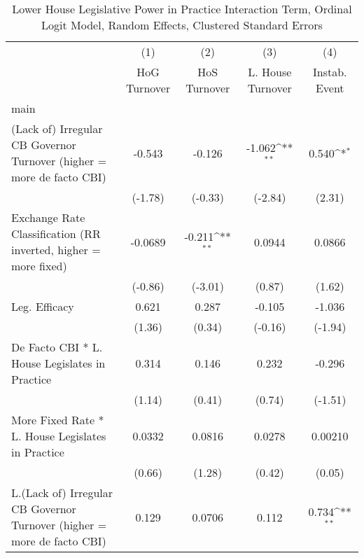 {
\def\sym#1{\ifmmode^{#1}\else\(^{#1}\)\fi}
\begin{longtable}{l*{4}{c}}
\caption{Lower House Legislative Power in Practice Interaction Term, Ordinal Logit Model, Random Effects, Clustered Standard Errors \label{llpintlagordLogDF}}\\
\hline\hline\endfirsthead\hline\endhead\hline\endfoot\endlastfoot
                &\multicolumn{1}{c}{(1)}&\multicolumn{1}{c}{(2)}&\multicolumn{1}{c}{(3)}&\multicolumn{1}{c}{(4)}\\
                &\multicolumn{1}{c}{HoG Turnover}&\multicolumn{1}{c}{HoS Turnover}&\multicolumn{1}{c}{L. House Turnover}&\multicolumn{1}{c}{Instab. Event}\\
\hline
main            &                  &                  &                  &                  \\
(Lack of) Irregular CB Governor Turnover (higher = more de facto CBI)&   -0.543         &   -0.126         &   -1.062\sym{**} &    0.540\sym{*}  \\
                &  (-1.78)         &  (-0.33)         &  (-2.84)         &   (2.31)         \\
[1em]
Exchange Rate Classification (RR inverted, higher = more fixed)&  -0.0689         &   -0.211\sym{**} &   0.0944         &   0.0866         \\
                &  (-0.86)         &  (-3.01)         &   (0.87)         &   (1.62)         \\
[1em]
Leg. Efficacy   &    0.621         &    0.287         &   -0.105         &   -1.036         \\
                &   (1.36)         &   (0.34)         &  (-0.16)         &  (-1.94)         \\
[1em]
De Facto CBI * L. House Legislates in Practice&    0.314         &    0.146         &    0.232         &   -0.296         \\
                &   (1.14)         &   (0.41)         &   (0.74)         &  (-1.51)         \\
[1em]
More Fixed Rate * L. House Legislates in Practice&   0.0332         &   0.0816         &   0.0278         &  0.00210         \\
                &   (0.66)         &   (1.28)         &   (0.42)         &   (0.05)         \\
[1em]
L.(Lack of) Irregular CB Governor Turnover (higher = more de facto CBI)&    0.129         &   0.0706         &    0.112         &    0.734\sym{**} \\

\end{longtable}}
